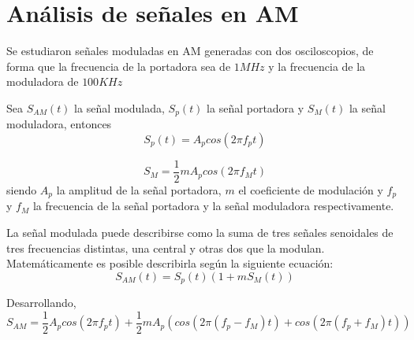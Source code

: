 \section{Análisis de señales en AM}
Se estudiaron señales moduladas en AM generadas con dos osciloscopios, de forma que la frecuencia de la portadora sea de $1MHz$ y la frecuencia de la moduladora de $100 KHz$

Sea $S_{AM}(t)$ la señal modulada, $S_p(t)$ la señal portadora y $S_M(t)$ la señal moduladora, entonces 
\begin{equation}
    S_p(t)=A_pcos(2\pi f_pt)
\label{eq:Sp}
\end{equation}

\begin{equation}
    S_M=\frac{1}{2}mA_pcos(2\pi f_Mt)
\label{eq:Sm}
\end{equation}
siendo $A_p$ la amplitud de la señal portadora, $m$ el coeficiente de modulación y $f_p$ y $f_M$ la frecuencia de la señal portadora y la señal moduladora respectivamente.

La señal modulada puede describirse como la suma de tres señales senoidales de tres frecuencias distintas, una central y otras dos que la modulan. Matemáticamente es posible describirla según la siguiente ecuación:
\begin{equation}
    S_{AM}(t)=S_p(t)(1+mS_M(t))
    \label{eq:sam2}
\end{equation}

Desarrollando,
\begin{equation}
    S_{AM}=\frac{1}{2}A_pcos(2\pi f_pt)+\frac{1}{2}mA_p(cos(2\pi (f_p-f_M)t)+cos(2\pi (f_p+f_M)t))
    \label{eq:Sam}
\end{equation}
